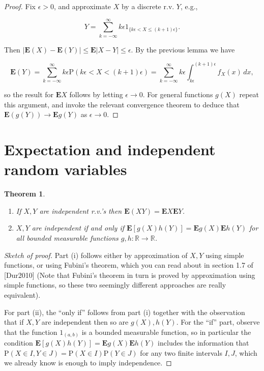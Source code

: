 \documentclass[11pt]{report}
\newcommand{\R}{\mathbb{R}}
\theoremstyle{plain}
\newtheorem{thm}{Theorem}[chapter]
\theoremstyle{definition}
\begin{document}
\begin{proof}
Fix $\epsilon>0$, and approximate $X$ by a discrete
r.v. $Y$, e.g.,

\[
Y = \sum_{k=-\infty}^\infty k\epsilon 1_{\{k\epsilon < X \le (k+1)\epsilon\}}.
\]

\noindent Then
$|\mathbf{E}(X)-\mathbf{E}(Y)| \le \mathbf{E}|X-Y|
\le \epsilon$.
By the previous lemma we have

\[
\mathbf{E}(Y)  = \sum_{k=-\infty}^\infty k\epsilon \mathrm{P}(k\epsilon<X<(k+1)\epsilon) =\sum_{k=-\infty}^\infty k\epsilon \int_{k\epsilon}^{(k+1)\epsilon} f_X(x)\,dx,
\]

\noindent so the result for $\mathbf{E} X$ follows by letting
$\epsilon\to 0$. For general functions $g(X)$ repeat
this argument, and invoke the relevant convergence
theorem to deduce that
$\mathbf{E}(g(Y))\to \mathbf{E} g(Y)$ as
$\epsilon\to 0$.
\end{proof}

\section{Expectation and independent random variables}

\begin{thm}

\begin{enumerate}[label=(\roman*)]
\item If $X,Y$ are independent r.v.'s then
$\mathbf{E}(X Y) = \mathbf{E} X \mathbf{E} Y$.

\item $X,Y$ are independent if and only if
$\mathbf{E}[g(X)h(Y)] = \mathbf{E} g(X) \mathbf{E}
h(Y)$
for all bounded measurable functions $g,h:\R\to\R$.
\end{enumerate}

\end{thm}

\begin{proof}[Sketch of proof]
Part (i) follows either by approximation of $X,Y$
using simple functions, or using Fubini's theorem,
which you can read about in section 1.7 of [Dur2010]
(Note that Fubini's theorem in turn is proved by
approximation using simple functions, so these two
seemingly different approaches are really equivalent).

For part (ii), the ``only if'' follows from part (i)
together with the observation that if $X,Y$ are
independent then so are $g(X), h(Y)$. For the ``if''
part, observe that the function $1_{(a,b)}$ is a
bounded measurable function, so in particular the
condition
$\mathbf{E}[g(X)h(Y)]=\mathbf{E} g(X) \mathbf{E}
h(Y)$
includes the information that
$\mathrm{P}(X\in I, Y\in J)=\mathrm{P}(X \in I)
\mathrm{P}(Y\in J)$
for any two finite intervals $I,J$, which we already
know is enough to imply independence.
\end{proof}
\end{document}
